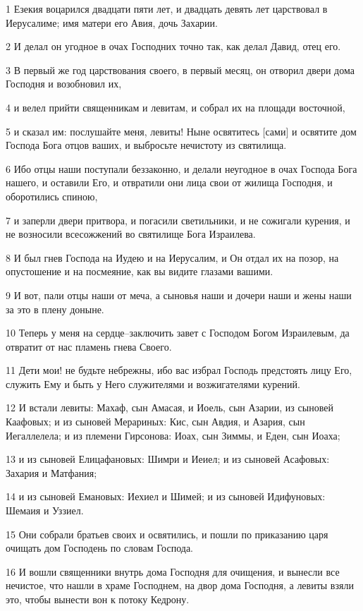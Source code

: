 \par 1 Езекия воцарился двадцати пяти лет, и двадцать девять лет царствовал в Иерусалиме; имя матери его Авия, дочь Захарии.
\par 2 И делал он угодное в очах Господних точно так, как делал Давид, отец его.
\par 3 В первый же год царствования своего, в первый месяц, он отворил двери дома Господня и возобновил их,
\par 4 и велел прийти священникам и левитам, и собрал их на площади восточной,
\par 5 и сказал им: послушайте меня, левиты! Ныне освятитесь [сами] и освятите дом Господа Бога отцов ваших, и выбросьте нечистоту из святилища.
\par 6 Ибо отцы наши поступали беззаконно, и делали неугодное в очах Господа Бога нашего, и оставили Его, и отвратили они лица свои от жилища Господня, и оборотились спиною,
\par 7 и заперли двери притвора, и погасили светильники, и не сожигали курения, и не возносили всесожжений во святилище Бога Израилева.
\par 8 И был гнев Господа на Иудею и на Иерусалим, и Он отдал их на позор, на опустошение и на посмеяние, как вы видите глазами вашими.
\par 9 И вот, пали отцы наши от меча, а сыновья наши и дочери наши и жены наши за это в плену доныне.
\par 10 Теперь у меня на сердце--заключить завет с Господом Богом Израилевым, да отвратит от нас пламень гнева Своего.
\par 11 Дети мои! не будьте небрежны, ибо вас избрал Господь предстоять лицу Его, служить Ему и быть у Него служителями и возжигателями курений.
\par 12 И встали левиты: Махаф, сын Амасая, и Иоель, сын Азарии, из сыновей Каафовых; и из сыновей Мерариных: Кис, сын Авдия, и Азария, сын Иегаллелела; и из племени Гирсонова: Иоах, сын Зиммы, и Еден, сын Иоаха;
\par 13 и из сыновей Елицафановых: Шимри и Иеиел; и из сыновей Асафовых: Захария и Матфания;
\par 14 и из сыновей Емановых: Иехиел и Шимей; и из сыновей Идифуновых: Шемаия и Уззиел.
\par 15 Они собрали братьев своих и освятились, и пошли по приказанию царя очищать дом Господень по словам Господа.
\par 16 И вошли священники внутрь дома Господня для очищения, и вынесли все нечистое, что нашли в храме Господнем, на двор дома Господня, а левиты взяли это, чтобы вынести вон к потоку Кедрону.
